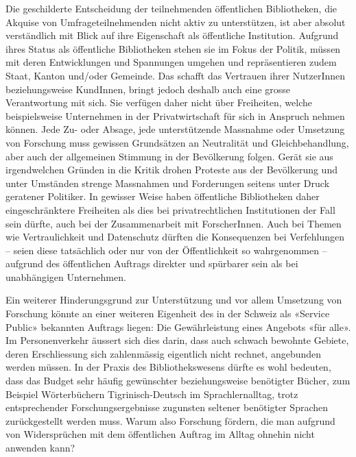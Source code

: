 \documentclass[a4paper,
fontsize=11pt,
oneside,
numbers=noperiodatend,
parskip=half-,
bibliography=totoc,
final
]{scrartcl}
\begin{document}
Die geschilderte Entscheidung der teilnehmenden öffentlichen
Bibliotheken, die Akquise von Umfrageteilnehmenden nicht aktiv zu
unterstützen, ist aber absolut verständlich mit Blick auf ihre
Eigenschaft als öffentliche Institution. Aufgrund ihres Status als
öffentliche Bibliotheken stehen sie im Fokus der Politik, müssen mit
deren Entwicklungen und Spannungen umgehen und repräsentieren zudem
Staat, Kanton und/oder Gemeinde. Das schafft das Vertrauen ihrer
NutzerInnen beziehungsweise KundInnen, bringt jedoch deshalb auch eine
grosse Verantwortung mit sich. Sie verfügen daher nicht über Freiheiten,
welche beispielsweise Unternehmen in der Privatwirtschaft für sich in
Anspruch nehmen können. Jede Zu- oder Absage, jede unterstützende
Massnahme oder Umsetzung von Forschung muss gewissen Grundsätzen an
Neutralität und Gleichbehandlung, aber auch der allgemeinen Stimmung in
der Bevölkerung folgen. Gerät sie aus irgendwelchen Gründen in die
Kritik drohen Proteste aus der Bevölkerung und unter Umständen strenge
Massnahmen und Forderungen seitens unter Druck geratener Politiker. In
gewisser Weise haben öffentliche Bibliotheken daher eingeschränktere
Freiheiten als dies bei privatrechtlichen Institutionen der Fall sein
dürfte, auch bei der Zusammenarbeit mit ForscherInnen. Auch bei Themen
wie Vertraulichkeit und Datenschutz dürften die Konsequenzen bei
Verfehlungen -- seien diese tatsächlich oder nur von der Öffentlichkeit
so wahrgenommen -- aufgrund des öffentlichen Auftrags direkter und
spürbarer sein als bei unabhängigen Unternehmen.

Ein weiterer Hinderungsgrund zur Unterstützung und vor allem Umsetzung
von Forschung könnte an einer weiteren Eigenheit des in der Schweiz als
«Service Public» bekannten Auftrags liegen: Die Gewährleistung eines
Angebots «für alle». Im Personenverkehr äussert sich dies darin, dass
auch schwach bewohnte Gebiete, deren Erschliessung sich zahlenmässig
eigentlich nicht rechnet, angebunden werden müssen. In der Praxis des
Bibliothekswesens dürfte es wohl bedeuten, dass das Budget sehr häufig
gewünschter beziehungsweise benötigter Bücher, zum Beispiel
Wörterbüchern Tigrinisch-Deutsch im Sprachlernalltag, trotz
entsprechender Forschungsergebnisse zugunsten seltener benötigter
Sprachen zurückgestellt werden muss. Warum also Forschung fördern, die
man aufgrund von Widersprüchen mit dem öffentlichen Auftrag im Alltag
ohnehin nicht anwenden kann?
\end{document}
